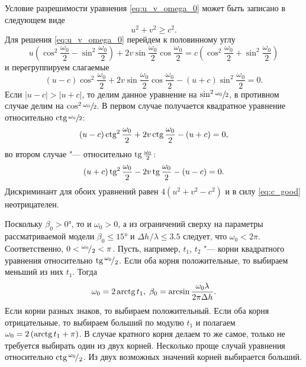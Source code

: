 \documentclass[../main.tex]{subfiles}
\begin{document}
Условие разрешимости уравнения \eqref{eq:u_v_omega_0} может быть записано в следующем виде
\begin{equation} \label{eq:c_good}
  u^2 + v^2 \geq c^2.
\end{equation}
Для решения \eqref{eq:u_v_omega_0} перейдем к половинному углу
\begin{equation*}
  u \left( \cos^2\frac{\omega_0}{2} - \sin^2\frac{\omega_0}{2} \right) + 2v \sin\frac{\omega_0}{2} \cos\frac{\omega_0}{2} = 
  c \left(\cos^2\frac{\omega_0}{2} + \sin^2\frac{\omega_0}{2} \right)
\end{equation*}
и перегруппируем слагаемые
\begin{equation*}
  \left(u - c\right) \cos^2\frac{\omega_0}{2} + 2v \sin\frac{\omega_0}{2} \cos\frac{\omega_0}{2} - \left(u + c\right) \sin^2\frac{\omega_0}{2} = 0.
\end{equation*}
Если $\left|u - c\right| > \left|u + c\right|$, то делим данное уравнение на $\sin^2 \sfrac{\omega_0}{2}$, в противном случае делим на $\cos^2 \sfrac{\omega_0}{2}$. В первом случае получается квадратное уравнение относительно $\operatorname{\text{ctg}} \sfrac{\omega_0}{2}$:
\begin{equation*}
    \left(u - c\right) \operatorname{\text{ctg}}^2 \frac{\omega_0}{2} + 2v \operatorname{\text{ctg}}\frac{\omega_0}{2} - \left(u + c\right) = 0,
\end{equation*}
во втором случае "--- относительно $\operatorname{\text{tg}} \frac{\omega_0}{2}$:
\begin{equation*}
    \left(u + c\right) \operatorname{\text{tg}}^2 \frac{\omega_0}{2} - 2v \operatorname{\text{tg}} \frac{\omega_0}{2} - \left(u - c\right) = 0.
\end{equation*}
Дискриминант для обоих уравнений равен $4\left(u^2 + v^2 - c^2\right)$ и в силу \eqref{eq:c_good} неотрицателен.

Поскольку $\beta_0 > \ang{0}$, то и $\omega_0 > 0$, а из ограничений сверху на параметры рассматриваемой модели $\beta_0 \leq \ang{15}$ и $ \Delta h^{}/\lambda \leq 3.5$ следует, что $\omega_0 < 2 \pi $. Соответственно, $0 < {}^{\omega_0}\!/_{2} < \pi$. Пусть, например, $t_1$, $t_2$ "--- корни квадратного уравнения относительно $\operatorname{\text{tg}} {}^{\omega_0}\!/_{2}$. Если оба корня положительные, то выбираем меньший из них $t_1$. Тогда
\begin{equation*}
  \omega_0 = 2 \operatorname{\text{arctg}} t_1, \; \beta_0 = \arcsin \frac{\omega_0 \lambda} {2\pi \Delta h}.
\end{equation*}
Если корни разных знаков, то выбираем положительный. Если оба корня отрицательные, то выбираем больший по модулю $t_1$ и полагаем $\omega_0 = 2\left( \operatorname{\text{arctg}} t_1 + \pi\right)$. В случае кратного корня делаем то же самое, только не требуется выбирать один из двух корней.
Несколько проще случай уравнения относительно $\operatorname{\text{ctg}}{}^{\omega_0}\!/_{2}$. Из двух возможных значений корней выбирается больший.
\end{document}
